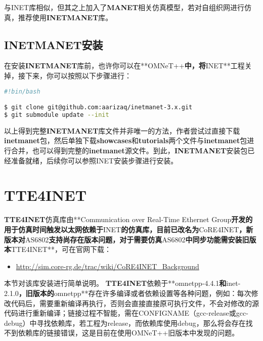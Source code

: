 与INET库相似，但其之上加入了\textbf{MANET}相关仿真模型，若对自组织网进行仿真，推荐使用\textbf{INETMANET}库。

\subsection{INETMANET安装}
\label{inetmanet安装}

在安装\textbf{INETMANET}库前，也许你可以在**OMNeT++\textbf{中，将}INET**工程关掉，接下来，你可以按照以下步骤进行：

\begin{lstlisting}[language=bash]
#!bin/bash

$ git clone git@github.com:aarizaq/inetmanet-3.x.git
$ git submodule update --init

\end{lstlisting}

以上得到完整\textbf{INETMANET}库文件并非唯一的方法，作者尝试过直接下载\textbf{inetmanet}包，然后单独下载\textbf{showcases}和\textbf{tutorials}两个文件与\textbf{inetmanet}包进行合并，也可以得到完整的\textbf{inetmanet}源文件。到此，\textbf{INETMANET}安装包已经准备就绪，后续你可以参照INET安装步骤进行安装。

\section{TTE4INET}
\label{tte4inet}

\textbf{TTE4INET}仿真库由**Communication over Real-Time Ethernet Group\textbf{开发的用于仿真时间触发以太网依赖于}INET\textbf{的仿真库，目前已改名为}CoRE4INET\textbf{，新版本对}AS6802\textbf{支持尚存在版本问题，对于需要仿真}AS6802\textbf{中同步功能需安装旧版本}TTE4INET**，可在官网下载：

\begin{itemize}
\item \href{http://sim.core-rg.de/trac/wiki/CoRE4INET_Background}{http:\slash \slash sim.core-rg.de\slash trac\slash wiki\slash CoRE4INET\_Background}

\end{itemize}

本节对该库安装进行简单说明。
\textbf{TTE4INET}依赖于**omnetpp-4.4.1\textbf{和}inet-2.1.0\textbf{，旧版本的}omnetpp**存在许多编译或者依赖设置等各种问题，例如：每次修改代码后，需要重新编译再执行，否则会直接直接原可执行文件，不会对修改的源代码进行重新编译；链接过程不智能，需在CONFIGNAME（gcc-release或gcc-debug）中寻找依赖库，若工程为release，而依赖库使用debug，那么将会存在找不到依赖库的链接错误，这是目前在使用OMNeT++旧版本中发现的问题。

